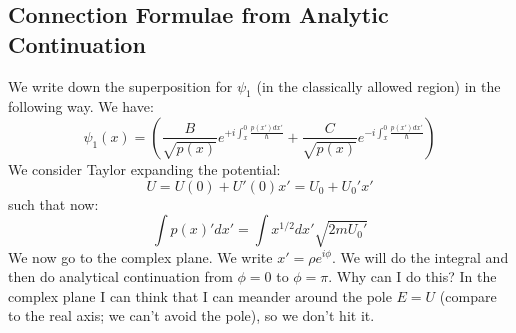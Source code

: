 \subsection{Connection Formulae from Analytic Continuation}
We write down the superposition for $\psi_1$ (in the classically allowed region) in the following way. We have:
\begin{equation}
    \psi_1(x) = \left(\frac{B}{\sqrt{p(x)}}e^{+i\int_x^0 \frac{p(x')dx'}{\hbar}} + \frac{C}{\sqrt{p(x)}}e^{-i\int_x^0 \frac{p(x')dx'}{\hbar}}\right)
\end{equation}
We consider Taylor expanding the potential:
\begin{equation}
    U = U(0) + U'(0) x' = U_0 + U_0' x'
\end{equation}
such that now:
\begin{equation}
   \int  p(x)' dx' = \int x^{1/2}dx'\sqrt{2mU_0'}
\end{equation}
We now go to the complex plane. We write $x' = \rho e^{i\phi}$. We will do the integral and then do analytical continuation from $\phi = 0$ to $\phi = \pi$. Why can I do this? In the complex plane I can think that I can meander around the pole $E = U$ (compare to the real axis; we can't avoid the pole), so we don't hit it.

